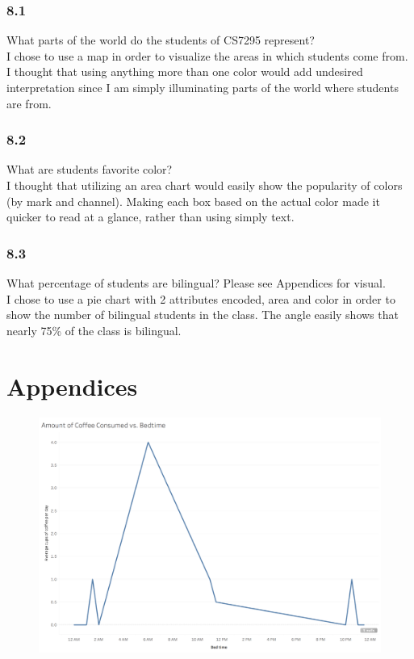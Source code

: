 \documentclass{neu_handout}
\begin{document}
\subsubsection*{8.1}

What parts of the world do the students of CS7295 represent?\\

I chose to use a map in order to visualize the areas in which students come from. I thought that using anything more than one color would add undesired interpretation since I am simply illuminating parts of the world where students are from.


\subsubsection*{8.2}
What are students favorite color? \\

I thought that utilizing an area chart would easily show the popularity of colors (by mark and channel). Making each box based on the actual color made it quicker to read at a glance, rather than using simply text.


\subsubsection*{8.3}
What percentage of students are bilingual? Please see Appendices for visual.\\

I chose to use a pie chart with 2 attributes encoded, area and color in order to show the number of bilingual students in the class. The angle easily shows that nearly 75\% of the class is bilingual.

\newpage

\appendix
\section{Appendices}

\begin{figure}[h]
\centering
{
\includegraphics[width=0.7\linewidth]{bedtime_coffee}
}
\end{figure}
\end{document}
